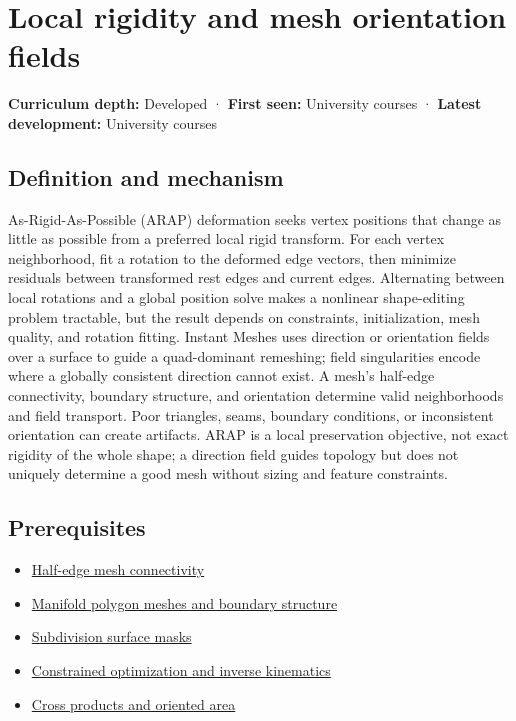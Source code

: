 \hypertarget{appendix-7107009c505b}{}\label{referencestart:appendix-7107009c505b}
\section{Local rigidity and mesh orientation fields}\label{appendix-7107009c505b-local-rigidity-and-mesh-orientation-fields}

\textbf{Curriculum depth:} Developed · \textbf{First seen:} University courses · \textbf{Latest development:} University courses

\subsection{Definition and mechanism}\label{appendix-7107009c505b-definition-and-mechanism}

As-Rigid-As-Possible (ARAP) deformation seeks vertex positions that change as little as possible from a preferred local rigid transform. For each vertex neighborhood, fit a rotation to the deformed edge vectors, then minimize residuals between transformed rest edges and current edges. Alternating between local rotations and a global position solve makes a nonlinear shape-editing problem tractable, but the result depends on constraints, initialization, mesh quality, and rotation fitting. Instant Meshes uses direction or orientation fields over a surface to guide a quad-dominant remeshing; field singularities encode where a globally consistent direction cannot exist. A mesh's half-edge connectivity, boundary structure, and orientation determine valid neighborhoods and field transport. Poor triangles, seams, boundary conditions, or inconsistent orientation can create artifacts. ARAP is a local preservation objective, not exact rigidity of the whole shape; a direction field guides topology but does not uniquely determine a good mesh without sizing and feature constraints.

\subsection{Prerequisites}\label{appendix-7107009c505b-prerequisites}

\begin{itemize}
\tightlist
\item
  \hyperref[appendix-1aea26b2307f]{Half-edge mesh connectivity}
\item
  \hyperref[appendix-fab348609369]{Manifold polygon meshes and boundary structure}
\item
  \hyperref[appendix-0234ab7f86b1]{Subdivision surface masks}
\item
  \hyperref[appendix-29f4bea4c2bb]{Constrained optimization and inverse kinematics}
\item
  \hyperref[appendix-2391db8052b1]{Cross products and oriented area}
\end{itemize}

